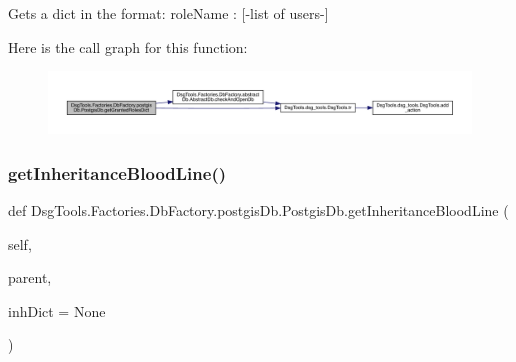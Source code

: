 \begin{DoxyVerb}Gets a dict in the format:
{ roleName : [-list of users-] } 
\end{DoxyVerb}
 Here is the call graph for this function\+:
\nopagebreak
\begin{figure}[H]
\begin{center}
\leavevmode
\includegraphics[width=350pt]{class_dsg_tools_1_1_factories_1_1_db_factory_1_1postgis_db_1_1_postgis_db_acc7130a91fa8a1104c3f7d1c4e3fc2f3_cgraph}
\end{center}
\end{figure}
\mbox{\label{class_dsg_tools_1_1_factories_1_1_db_factory_1_1postgis_db_1_1_postgis_db_ac90cfbc458f443c776716d93804e19a1}} 
\subsubsection{\texorpdfstring{get\+Inheritance\+Blood\+Line()}{getInheritanceBloodLine()}}
{\footnotesize\ttfamily def Dsg\+Tools.\+Factories.\+Db\+Factory.\+postgis\+Db.\+Postgis\+Db.\+get\+Inheritance\+Blood\+Line (\begin{DoxyParamCaption}\item[{}]{self,  }\item[{}]{parent,  }\item[{}]{inh\+Dict = {\ttfamily None} }\end{DoxyParamCaption})}

